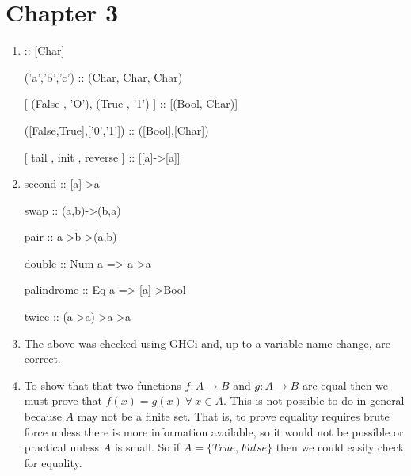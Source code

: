 \documentclass{article}
\begin{document}
\section{Chapter 3}
\begin{enumerate}
\item 
\begin{code}
['a','b','c'] :: [Char]

('a','b','c') :: (Char, Char, Char)

[ (False , 'O'), (True , '1') ]  :: [(Bool, Char)]

([False,True],[’0’,’1’])  :: ([Bool],[Char])

[ tail , init , reverse ] :: [[a]->[a]]
\end{code}

\item 
\begin{code}
second :: [a]->a

swap :: (a,b)->(b,a)

pair :: a->b->(a,b)

double :: Num a => a->a

palindrome :: Eq a => [a]->Bool

twice :: (a->a)->a->a
\end{code}

\item The above was checked using GHCi and, up to a variable name change, are correct. 

\item To show that that two functions $f: A \to B$ and $g:A \to B$ are equal then we must prove that $f(x)=g(x) \ \forall \ x \in A$. This is not possible to do in general because $A$ may not be a finite set. That is, to prove equality requires brute force unless there is more information available, so it would not be possible or practical unless $A$ is small. So if $A=\{True, False\}$ then we could easily check for equality. 
\end{enumerate}
\end{document}

